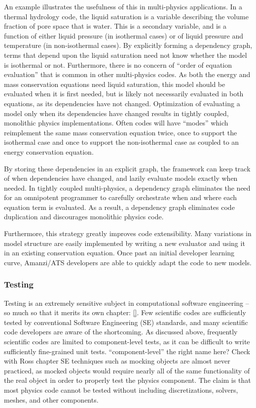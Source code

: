 An example illustrates the usefulness of this in multi-physics
applications.  In a thermal hydrology code, the liquid saturation is a
variable describing the volume fraction of pore space that is water.
This is a secondary variable, and is a function of either liquid
pressure (in isothermal cases) or of liquid pressure and temperature
(in non-isothermal cases).  By explicitly forming a dependency graph,
terms that depend upon the liquid saturation need not know whether the
model is isothermal or not.  Furthermore, there is no concern of
``order of equation evaluation'' that is common in other multi-physics
codes.  As both the energy and mass conservation equations need liquid
saturation, this model should be evaluated when it is first needed,
but is likely not necessarily evaluated in both equations, as its
dependencies have not changed.  Optimization of evaluating a model
only when its dependencies have changed results in tightly coupled,
monolithic physics implementations.  Often codes will have ``modes''
which reimplement the same mass conservation equation twice, once to
support the isothermal case and once to support the non-isothermal
case as coupled to an energy conservation equation.

By storing these dependencies in an explicit graph, the framework can
keep track of when dependencies have changed, and lazily evaluate
models exactly when needed.  In tightly coupled multi-physics, a
dependency graph eliminates the need for an omnipotent programmer to
carefully orchestrate when and where each equation term is evaluated.
As a result, a dependency graph eliminates code duplication and
discourages monolithic physics code.

Furthermore, this strategy greatly improves code extensibility.  Many
variations in model structure are easily implemented by writing a new
evaluator and using it in an existing conservation equation.  Once
past an initial developer learning curve, Amanzi/ATS developers are
able to quickly adapt the code to new models.

\subsubsection{Testing}
\label{sec:amanzi:testing}
%
Testing is an extremely sensitive subject in computational software
engineering -- so much so that it merits its own chapter: \ref{}.  Few
scientific codes are sufficiently tested by conventional Software
Engineering (SE) standards, and many scientific code developers are
aware of the shortcoming.  As discussed above, frequently scientific
codes are limited to component-level tests, as it can be difficult to
write sufficiently fine-grained unit tests.  %
``component-level'' the right name here?  Check with Ross chapter SE
techniques such as mocking objects are almost never practiced, as
mocked objects would require nearly all of the same functionality of
the real object in order to properly test the physics component.  The
claim is that most physics code cannot be tested without including
discretizations, solvers, meshes, and other components.

